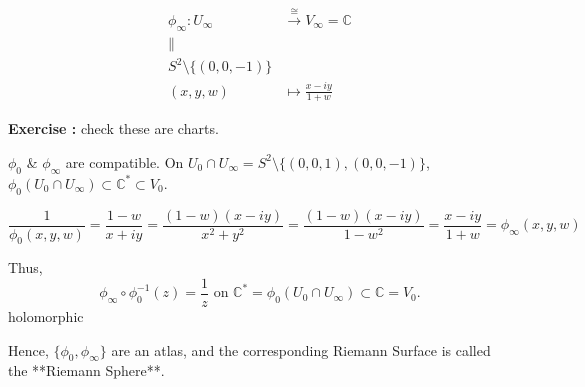 \documentclass{article}
\begin{document}
\begin{align*}
    \phi_{\infty} : U_{\infty} &\xrightarrow{\cong} V_{\infty} = \mathbb{C} \\
    \parallel \\
    S^2 \setminus \{ (0, 0, -1) \} \\
    (x, y, w) &\longmapsto \frac{x-iy}{1+w}
\end{align*}

\textbf{Exercise :} check these are charts.

$\phi_0$ \& $\phi_{\infty}$ are compatible. On $U_0 \cap U_{\infty} = S^2 \setminus \{ (0,0,1), (0,0,-1) \}$, $\phi_0(U_0 \cap U_{\infty}) \subset \mathbb{C}^* \subset V_0$.

$$
\frac{1}{\phi_0(x, y, w)} = \frac{1-w}{x+iy} = \frac{(1-w)(x-iy)}{x^2+y^2} = \frac{(1-w)(x-iy)}{1-w^2} = \frac{x-iy}{1+w} = \phi_{\infty}(x, y, w)
$$

Thus,
$$
\phi_{\infty} \circ \phi_0^{-1} (z) = \frac{1}{z} \text{ on } \mathbb{C}^* = \phi_0 (U_0 \cap U_{\infty}) \subset \mathbb{C} = V_0.
$$
holomorphic

Hence, $\{ \phi_0, \phi_{\infty} \}$ are an atlas, and the corresponding Riemann Surface is called the **Riemann Sphere**.
\end{document}
